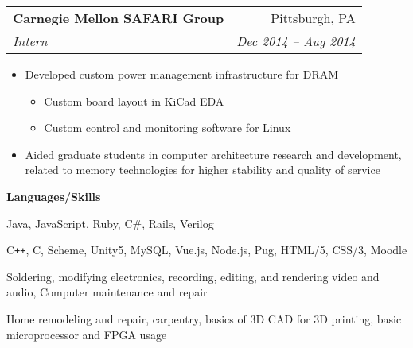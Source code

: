 \documentclass[letterpaper,11pt]{article}
\makeatletter
\newcommand{\resitem}[1]{\item #1}
\newcommand{\resheading}[1]{{\large \colorbox{shadingcolor}{\begin{minipage}{\textwidth}{\textbf{#1 \vphantom{p\^{E}}}}\end{minipage}}}}
\newcommand{\ressubheading}[4]{
\begin{tabular*}{\textwidth}{l@{\extracolsep{\fill}}r}
		\textbf{#1} & #2 \\
		\textit{#3} & \textit{#4} \\
\end{tabular*}\vspace{-6pt}}
\makeatother
\begin{document}
\begin{minipage}{\linewidth}
\begin{minipage}[t]{0.6\linewidth}
	\ressubheading{Carnegie Mellon SAFARI Group}{Pittsburgh, PA}{Intern}{Dec 2014 -- Aug 2014}
	\begin{itemize}[leftmargin=*,noitemsep]
		\resitem{Developed custom power management infrastructure for DRAM}
		\begin{itemize}[leftmargin=*,noitemsep,topsep=0pt]
			\resitem{Custom board layout in KiCad EDA}
			\resitem{Custom control and monitoring software for Linux}
		\end{itemize}
		\resitem{Aided graduate students in computer architecture research and development, related to memory technologies for higher stability and quality of service}
	\end{itemize}
\end{minipage}
\hfill
\begin{minipage}[t]{0.35\linewidth}
	\begin{minipage}[t]{\linewidth}
		\resheading{Languages/Skills}
		
		\begin{description}[noitemsep]
			\item[Strong:]
			Java, JavaScript, Ruby, C\#, Rails, Verilog
			\item[Weak:]
			C{}\verb!++!, C, Scheme, Unity5, MySQL, Vue.js, Node.js, Pug, HTML/5, CSS/3, Moodle
			
			\vspace{0.1in}
			\item[Skills:]
			Soldering, modifying electronics, 
			recording, editing, and rendering video and audio, 
			Computer maintenance and repair
			\item[Misc Skills:]
			Home remodeling and repair, carpentry,
			basics of 3D CAD for 3D printing,
			basic microprocessor and FPGA usage
		\end{description}
	\end{minipage}
\end{minipage}
\end{minipage}
\end{document}

